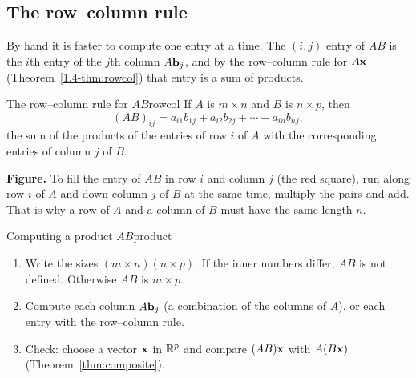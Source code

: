 \documentclass[11pt]{article}
\begin{document}
\subsection*{The row--column rule}

By hand it is faster to compute one entry at a time. The $(i,j)$ entry of $AB$ is the $i$th entry of the $j$th column $A\mathbf{b}_j$, and by the row--column rule for $A\mathbf{x}$ (Theorem~\ref{1.4-thm:rowcol}) that entry is a sum of products.

\begin{thm}{The row--column rule for $AB$}{rowcol}
If $A$ is $m\times n$ and $B$ is $n\times p$, then
\[
(AB)_{ij}=a_{i1}b_{1j}+a_{i2}b_{2j}+\cdots+a_{in}b_{nj},
\]
the sum of the products of the entries of row $i$ of $A$ with the corresponding entries of column $j$ of $B$.
\end{thm}

\begin{center}
\end{center}

\textbf{Figure.} To fill the entry of $AB$ in row $i$ and column $j$ (the red square), run along row $i$ of $A$ and down column $j$ of $B$ at the same time, multiply the pairs and add. That is why a row of $A$ and a column of $B$ must have the same length $n$.

\begin{proc}{Computing a product $AB$}{product}
\begin{enumerate}
  \item Write the sizes $(m\times n)(n\times p)$. If the inner numbers differ, $AB$ is not defined. Otherwise $AB$ is $m\times p$.
  \item Compute each column $A\mathbf{b}_j$ (a combination of the columns of $A$), or each entry with the row--column rule.
  \item Check: choose a vector $\mathbf{x}$ in $\mathbb{R}^p$ and compare $(AB)\mathbf{x}$ with $A(B\mathbf{x})$ (Theorem~\ref{thm:composite}).
\end{enumerate}
\end{proc}
\end{document}
